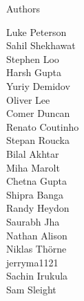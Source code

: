 \documentclass[xcolor=svgnames]{beamer}
\begin{document}
\begin{frame}{Authors}
\begin{multicols}{5}
        Luke Peterson\\
        Sahil Shekhawat\\
        Stephen Loo\\
        Harsh Gupta\\
        Yuriy Demidov\\
        Oliver Lee\\
        Comer Duncan\\
        Renato Coutinho\\
        Stepan Roucka\\
        Bilal Akhtar\\
        Miha Marolt\\
        Chetna Gupta\\
        Shipra Banga\\
        Randy Heydon\\
        Saurabh Jha\\
        Nathan Alison\\
        Niklas Thörne\\
        jerryma1121\\
        Sachin Irukula\\
        Sam Sleight\\
  \end{multicols}
\end{frame}
\end{document}
